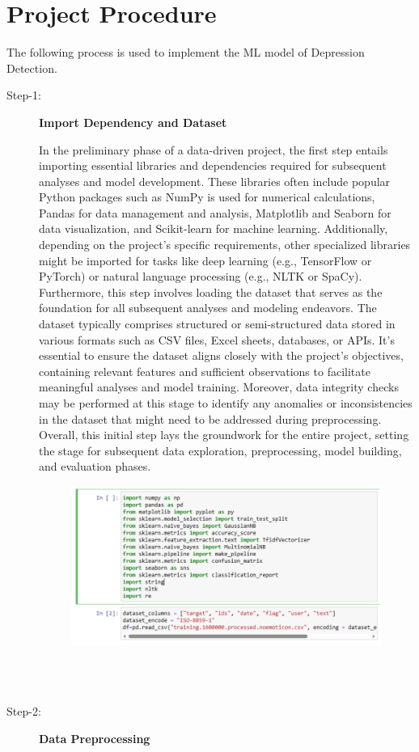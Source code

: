  \section {Project Procedure}
The following process is used to implement the ML model of Depression Detection.
 \begin{description}
\item[Step-1:]\textbf{Import Dependency and Dataset}

In the preliminary phase of a data-driven project, the first step entails importing essential libraries and dependencies required for subsequent analyses and model development. These libraries often include popular Python packages such as NumPy is used for numerical calculations, Pandas for data management and analysis, Matplotlib and Seaborn for data visualization, and Scikit-learn for machine learning. Additionally, depending on the project's specific requirements, other specialized libraries might be imported for tasks like deep learning (e.g., TensorFlow or PyTorch) or natural language processing (e.g., NLTK or SpaCy). 
\\
Furthermore, this step involves loading the dataset that serves as the foundation for all subsequent analyses and modeling endeavors. The dataset typically comprises structured or semi-structured data stored in various formats such as CSV files, Excel sheets, databases, or APIs. It's essential to ensure the dataset aligns closely with the project's objectives, containing relevant features and sufficient observations to facilitate meaningful analyses and model training\cite{narayanan2021efficient}. Moreover, data integrity checks may be performed at this stage to identify any anomalies or inconsistencies in the dataset that might need to be addressed during preprocessing. Overall, this initial step lays the groundwork for the entire project, setting the stage for subsequent data exploration, preprocessing, model building, and evaluation phases.
\begin{figure}[hbt!]
  \centering
  \includegraphics[width=0.6\linewidth]{C_chap/fig13.png}
\end{figure}
\\
\\
\item[Step-2:]\textbf{Data Preprocessing}


\end{description}
